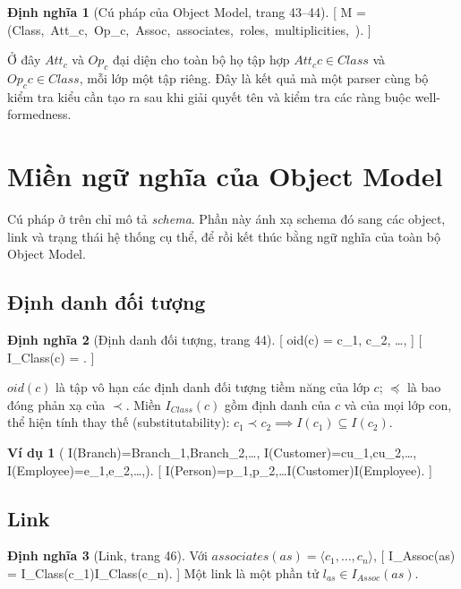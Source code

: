 \documentclass[12pt,a4paper]{article}
\theoremstyle{definition}
\newtheorem{dinhnghia}{Định nghĩa}
\newtheorem*{vidu}{Ví dụ}
\begin{document}
\begin{dinhnghia}[Cú pháp của Object Model, trang 43--44]\label{def:model}
[
M = (Class,\ Att_c,\ Op_c,\ Assoc,\ associates,\ roles,\ multiplicities,\ \prec).
]
\end{dinhnghia}

Ở đây $Att_c$ và $Op_c$ đại diện cho toàn bộ họ tập hợp ${Att_c}{c\in Class}$ và ${Op_c}{c\in Class}$, mỗi lớp một tập riêng. Đây là kết quả mà một parser cùng bộ kiểm tra kiểu cần tạo ra sau khi giải quyết tên và kiểm tra các ràng buộc well-formedness.

\section{Miền ngữ nghĩa của Object Model}

Cú pháp ở trên chỉ mô tả \emph{schema}. Phần này ánh xạ schema đó sang các object, link và trạng thái hệ thống cụ thể, để rồi kết thúc bằng ngữ nghĩa của toàn bộ Object Model.

\subsection{Định danh đối tượng}

\begin{dinhnghia}[Định danh đối tượng, trang 44]\label{def:oid}
[
oid(c) = {c_1, c_2, \ldots},
]
[
I_{Class}(c) = .
]
\end{dinhnghia}

$oid(c)$ là tập vô hạn các định danh đối tượng tiềm năng của lớp $c$; $\preceq$ là bao đóng phản xạ của $\prec$. Miền $I_{Class}(c)$ gồm định danh của $c$ và của mọi lớp con, thể hiện tính thay thế (substitutability): $c_1\prec c_2 \implies I(c_1)\subseteq I(c_2)$.

\begin{vidu}
[
I(Branch)={Branch_1,Branch_2,\ldots},\qquad
I(Customer)={cu_1,cu_2,\ldots},\qquad
I(Employee)={e_1,e_2,\ldots},
]
[
I(Person)={p_1,p_2,\ldots}\cup I(Customer)\cup I(Employee).
]
\end{vidu}

\subsection{Link}

\begin{dinhnghia}[Link, trang 46]\label{def:link}
Với $associates(as)=\langle c_1,\ldots,c_n\rangle$,
[
I_{Assoc}(as) = I_{Class}(c_1)\times\cdots\times I_{Class}(c_n).
]
Một link là một phần tử $l_{as}\in I_{Assoc}(as)$.
\end{dinhnghia}
\end{document}
